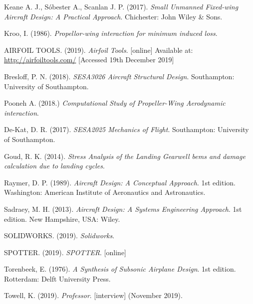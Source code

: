 \documentclass[../main.tex]{subfiles}
\begin{document}
\begin{thebibliography}{999}


  Keane A. J., S\'obester A., Scanlan J. P.
  (2017).
  \emph{Small Unmanned Fixed-wing Aircraft Design: A Practical Approach}.
  Chichester: John Wiley \& Sons.

Kroo, I.
(1986).
\emph{Propellor-wing interaction for minimum induced loss}.


  AIRFOIL TOOLS.
  (2019).
  \emph{Airfoil Tools}.
  [online]
  Available at:
  \url{http://airfoiltools.com/}
  [Accessed 19th December 2019]

  Bresloff, P. N.
  (2018).
  \emph{SESA3026 Aircraft Structural Design}.
  Southampton: University of Southampton.

  Pooneh A.
  (2018.)
  \emph{Computational Study of Propeller-Wing Aerodynamic interaction}.

  De-Kat, D. R.
  (2017).
  \emph{SESA2025 Mechanics of Flight}.
  Southampton: University of Southampton.

  Goud, R. K.
  (2014).
  \emph{Stress Analysis of the Landing Gearwell bems and damage calculation due to landing cycles}.

  Raymer, D. P.
  (1989).
  \emph{Aircraft Design: A Conceptual Approach}.
  1st edition.
  Washington: American Institute of Aeronautics and Astronautics.

  Sadraey, M. H.
  (2013).
  \emph{Aircraft Design: A Systems Engineering Approach}.
  1st edition.
  New Hampshire, USA: Wiley.

  SOLIDWORKS.
  (2019).
  \emph{Solidworks}.

  SPOTTER.
  (2019).
  \emph{SPOTTER}.
  [online]

  Torenbeek, E.
  (1976).
  \emph{A Synthesis of Subsonic Airplane Design}.
  1st edition.
  Rotterdam: Delft University Press.

  Towell, K.
  (2019).
  \emph{Professor}.
  [interview]
  (November 2019).

\end{thebibliography}
\end{document}
